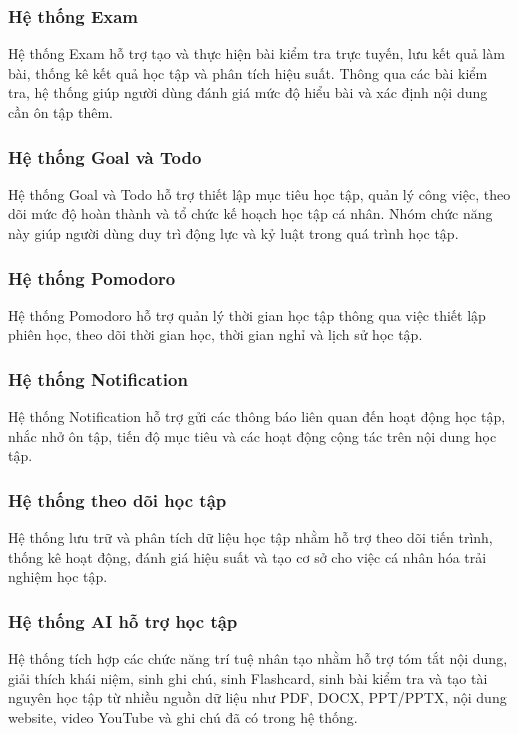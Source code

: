 \subsubsection{Hệ thống Exam}

Hệ thống Exam hỗ trợ tạo và thực hiện bài kiểm tra trực tuyến, lưu kết quả làm bài, thống kê kết quả học tập và phân tích hiệu suất. Thông qua các bài kiểm tra, hệ thống giúp người dùng đánh giá mức độ hiểu bài và xác định nội dung cần ôn tập thêm.

\subsubsection{Hệ thống Goal và Todo}

Hệ thống Goal và Todo hỗ trợ thiết lập mục tiêu học tập, quản lý công việc, theo dõi mức độ hoàn thành và tổ chức kế hoạch học tập cá nhân. Nhóm chức năng này giúp người dùng duy trì động lực và kỷ luật trong quá trình học tập.

\subsubsection{Hệ thống Pomodoro}

Hệ thống Pomodoro hỗ trợ quản lý thời gian học tập thông qua việc thiết lập phiên học, theo dõi thời gian học, thời gian nghỉ và lịch sử học tập.

\subsubsection{Hệ thống Notification}

Hệ thống Notification hỗ trợ gửi các thông báo liên quan đến hoạt động học tập, nhắc nhở ôn tập, tiến độ mục tiêu và các hoạt động cộng tác trên nội dung học tập.

\subsubsection{Hệ thống theo dõi học tập}

Hệ thống lưu trữ và phân tích dữ liệu học tập nhằm hỗ trợ theo dõi tiến trình, thống kê hoạt động, đánh giá hiệu suất và tạo cơ sở cho việc cá nhân hóa trải nghiệm học tập.

\subsubsection{Hệ thống AI hỗ trợ học tập}

Hệ thống tích hợp các chức năng trí tuệ nhân tạo nhằm hỗ trợ tóm tắt nội dung, giải thích khái niệm, sinh ghi chú, sinh Flashcard, sinh bài kiểm tra và tạo tài nguyên học tập từ nhiều nguồn dữ liệu như PDF, DOCX, PPT/PPTX, nội dung website, video YouTube và ghi chú đã có trong hệ thống.


